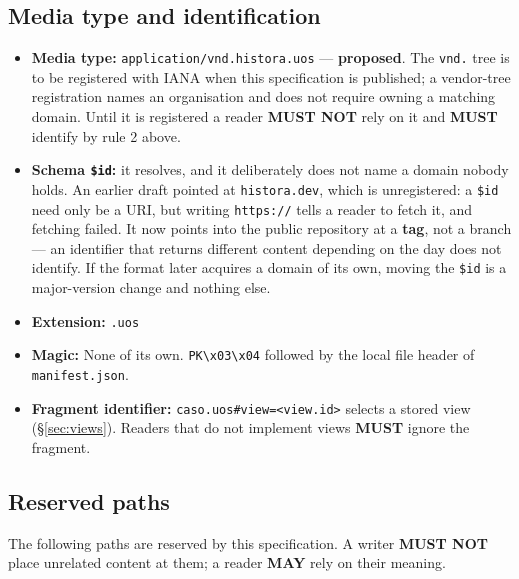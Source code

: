 \documentclass[11pt,a4paper]{article}
\newcommand{\MUST}{\textcolor{uosred}{\textbf{MUST}}}
\newcommand{\MUSTNOT}{\textcolor{uosred}{\textbf{MUST NOT}}}
\newcommand{\MAY}{\textcolor{uosgreen}{\textbf{MAY}}}
\newcommand{\code}[1]{\texttt{\small #1}}
\begin{document}
\subsection{Media type and identification}

\begin{itemize}
  \item \textbf{Media type:} \code{application/vnd.histora.uos} --- \textbf{proposed}. The \code{vnd.} tree is to be registered with IANA when this specification is published; a vendor-tree registration names an organisation and does not require owning a matching domain. Until it is registered a reader \MUSTNOT{} rely on it and \MUST{} identify by rule 2 above.
  
  \item \textbf{Schema \code{\$id}:} it resolves, and it deliberately does not name a domain nobody holds. An earlier draft pointed at \code{histora.dev}, which is unregistered: a \code{\$id} need only be a URI, but writing \code{https://} tells a reader to fetch it, and fetching failed. It now points into the public repository at a \textbf{tag}, not a branch --- an identifier that returns different content depending on the day does not identify. If the format later acquires a domain of its own, moving the \code{\$id} is a major-version change and nothing else.
  
  \item \textbf{Extension:} \code{.uos}
  
  \item \textbf{Magic:} None of its own. \code{PK\textbackslash x03\textbackslash x04} followed by the local file header of \code{manifest.json}.
  
  \item \textbf{Fragment identifier:} \code{caso.uos\#view=<view.id>} selects a stored view (\S\ref{sec:views}). Readers that do not implement views \MUST{} ignore the fragment.
\end{itemize}

\subsection{Reserved paths}\label{sec:paths}

The following paths are reserved by this specification. A writer \MUSTNOT{} place unrelated
content at them; a reader \MAY{} rely on their meaning.
\end{document}
